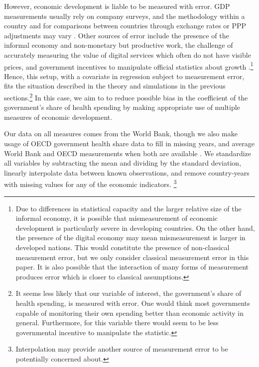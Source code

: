 \documentclass[10pt]{article}
\begin{document}
        However, economic development is liable to be measured with error. GDP measurements usually rely on company surveys, and the methodology within a country and for comparisons between countries through exchange rates or PPP adjustments may vary \citep{grishin_main_2019}. Other sources of error include the presence of the informal economy and non-monetary but productive work, the challenge of accurately measuring the value of digital services which often do not have visible prices, and government incentives to manipulate official statistics about growth \citep{charmes_informal_2012,ahmad_can_2017,nakamura_are_2016}.\footnote{Due to differences in statistical capacity and the larger relative size of the informal economy, it is possible that mismeasurement of economic development is particularly severe in developing countries. On the other hand, the presence of the digital economy may mean mismeasurement is larger in developed nations. This would constitute the presence of non-classical measurement error, but we only consider classical measurement error in this paper. It is also possible that the interaction of many forms of measurement produces error which is closer to classical assumptions.} Hence, this setup, with a covariate in regression subject to measurement error, fits the situation described in the theory and simulations in the previous sections.\footnote{It seems less likely that our variable of interest, the government's share of health spending, is measured with error. One would think most governments capable of monitoring their own spending better than economic activity in general. Furthermore, for this variable there would seem to be less governmental incentive to manipulate the statistic.} In this case, we aim to to reduce possible bias in the coefficient of the government's share of health spending by making appropriate use of multiple measures of economic development.

        Our data on all measures comes from the World Bank, though we also make usage of OECD government health share data to fill in missing years, and average World Bank and OECD measurements when both are available \citep{the_world_bank_indicators_2021,oecd_oecd_2021}. We standardize all variables by subtracting the mean and dividing by the standard deviation, linearly interpolate data between known observations, and remove country-years with missing values for any of the economic indicators. \footnote{Interpolation may provide another source of measurement error to be potentially concerned about.}
\end{document}
